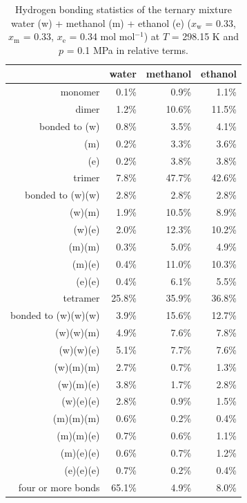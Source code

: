 \documentclass[preprint,12pt]{elsarticle}
\begin{document}
\begin{table}
  \centering
  \caption{Hydrogen bonding statistics of the ternary mixture water (w) + methanol (m) + ethanol (e) ($x_\text{w}$ = 0.33, $x_\text{m}$ = 0.33, $x_\text{e}$ = 0.34 mol mol$^{-1}$) at $T$ = 298.15 K and $p$ = 0.1 MPa in relative terms.} 
    \begin{tabular}{r| r| r| r}
		\hline
		& water & methanol & ethanol  \\
		\hline
monomer	            & 0.1\% &0.9\% &1.1\% \\ \hline
dimer		            &	1.2\% &	10.6\% &	11.5\% \\ \hline
bonded to (w)	      &	0.8\% &		3.5\% &		4.1\% \\
	(m)	              & 0.2\% &		3.3\% &		3.6\% \\
	(e)	              & 0.2\% &		3.8\% &		3.8\% \\ \hline
trimer	            &	7.8\% &		47.7\% &		42.6\% \\ \hline
bonded to (w)(w)	  &2.8\% &		2.8\% &		2.8\% \\
	(w)(m)	          &1.9\% &		10.5\% &		8.9\% \\
	(w)(e)	          &2.0\% &		12.3\% &		10.2\% \\
	(m)(m)	          &0.3\% &		5.0\% &		4.9\% \\
	(m)(e)	          &0.4\% &		11.0\% &		10.3\% \\
	(e)(e)	          &0.4\% &		6.1\% &		5.5\% \\ \hline
tetramer		        & 25.8\% &		35.9\% &		36.8\% \\ \hline
bonded to	(w)(w)(w) & 3.9\% &		15.6\% &		12.7\% \\
	(w)(w)(m)	        & 4.9\% &		7.6\% &		7.8\% \\
	(w)(w)(e)	        &5.1\% &		7.7\% &		7.6\% \\
	(w)(m)(m)	        &2.7\% &		0.7\% &		1.3\% \\
	(w)(m)(e)	        &3.8\% &		1.7\% &		2.8\% \\
	(w)(e)(e)	        &2.8\% &		0.9\% &		1.5\% \\
	(m)(m)(m)	        &0.6\% &		0.2\% &		0.4\% \\
	(m)(m)(e)	        &0.7\% &		0.6\% &		1.1\% \\
	(m)(e)(e)	        &0.6\% &		0.7\% &		1.2\% \\
	(e)(e)(e)	        &0.7\% &		0.2\% &		0.4\% \\ \hline
four or more bonds		  & 65.1\% &		4.9\% &		8.0\% \\ \hline
    \end{tabular}%
  \label{tab:hbond}%
\end{table}%
\end{document}
